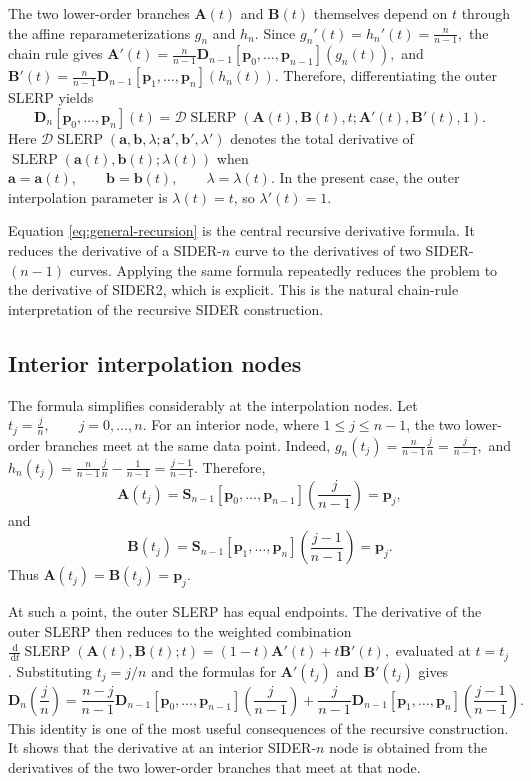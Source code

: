 \documentclass[a4paper,11pt]{article}
\newcommand{\bp}{\mathbf{p}}
\newcommand{\ba}{\mathbf{a}}
\newcommand{\bb}{\mathbf{b}}
\newcommand{\bA}{\mathbf{A}}
\newcommand{\bB}{\mathbf{B}}
\newcommand{\bD}{\mathbf{D}}
\numberwithin{equation}{section}
\theoremstyle{plain}
\theoremstyle{definition}
\theoremstyle{remark}
\newcommand{\slerp}{\operatorname{SLERP}}
\newcommand{\dd}{\,\mathrm{d}}
\begin{document}
The two lower-order branches $\bA(t)$ and $\bB(t)$ themselves depend on $t$ through the affine reparameterizations $g_n$ and $h_n$.  Since
\(g_n'(t)=h_n'(t)=\frac{n}{n-1},\)
the chain rule gives
\(\bA'(t) = \frac{n}{n-1} \bD_{n-1}[\bp_0,\ldots,\bp_{n-1}](g_n(t)),\)
and
\(\bB'(t) = \frac{n}{n-1} \bD_{n-1}[\bp_1,\ldots,\bp_n](h_n(t)).\)
Therefore, differentiating the outer SLERP yields
\begin{equation}
\label{eq:general-recursion}
\boxed{
        \bD_n[\bp_0,\ldots,\bp_n](t)
        =
        \mathcal{D}\slerp
        \left(
        \bA(t),\bB(t),t;
        \bA'(t),\bB'(t),1
        \right).
}
\end{equation}
Here $\mathcal{D}\slerp(\ba,\bb,\lambda;\ba',\bb',\lambda')$ denotes the total derivative of
\(\slerp(\ba(t),\bb(t);\lambda(t))\)
when
\(\ba=\ba(t),\qquad \bb=\bb(t),\qquad \lambda=\lambda(t).\)
In the present case, the outer interpolation parameter is $\lambda(t)=t$, so $\lambda'(t)=1$.

Equation \eqref{eq:general-recursion} is the central recursive derivative formula.  It reduces the derivative of a SIDER-$n$ curve to the derivatives of two SIDER-$(n-1)$ curves.  Applying the same formula repeatedly reduces the problem to the derivative of SIDER2, which is explicit.  This is the natural chain-rule interpretation of the recursive SIDER construction.

\subsection{Interior interpolation nodes}

The formula simplifies considerably at the interpolation nodes.  Let
\(t_j=\frac{j}{n}, \qquad j=0,\ldots,n.\)
For an interior node, where $1\leq j\leq n-1$, the two lower-order branches meet at the same data point.  Indeed,
\(g_n(t_j) = \frac{n}{n-1}\frac{j}{n} = \frac{j}{n-1},\)
and
\(h_n(t_j) = \frac{n}{n-1}\frac{j}{n} - \frac{1}{n-1} = \frac{j-1}{n-1}.\)
Therefore,
\[
        \bA(t_j)
        =
        \mathbf{S}_{n-1}[\bp_0,\ldots,\bp_{n-1}]
        \!\left(\frac{j}{n-1}\right)
        =
        \bp_j,
\]
and
\[
        \bB(t_j)
        =
        \mathbf{S}_{n-1}[\bp_1,\ldots,\bp_n]
        \!\left(\frac{j-1}{n-1}\right)
        =
        \bp_j.
\]
Thus
\(\bA(t_j)=\bB(t_j)=\bp_j.\)

At such a point, the outer SLERP has equal endpoints.  The derivative of the outer SLERP then reduces to the weighted combination
\(\frac{\dd}{\dd t}\slerp(\bA(t),\bB(t);t) = (1-t)\bA'(t)+t\bB'(t),\)
evaluated at $t=t_j$.  Substituting $t_j=j/n$ and the formulas for $\bA'(t_j)$ and $\bB'(t_j)$ gives
\begin{equation}
\label{eq:interior-node}
\boxed{
        \bD_n\!\left(\frac{j}{n}\right)
        =
        \frac{n-j}{n-1}
        \bD_{n-1}[\bp_0,\ldots,\bp_{n-1}]
        \!\left(\frac{j}{n-1}\right)
        +
        \frac{j}{n-1}
        \bD_{n-1}[\bp_1,\ldots,\bp_n]
        \!\left(\frac{j-1}{n-1}\right).
}
\end{equation}
This identity is one of the most useful consequences of the recursive construction.  It shows that the derivative at an interior SIDER-$n$ node is obtained from the derivatives of the two lower-order branches that meet at that node.
\end{document}
